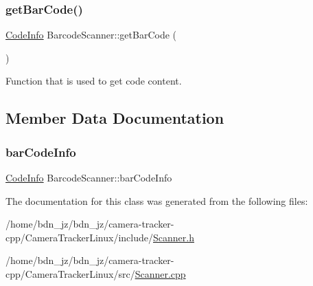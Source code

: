 \subsubsection{\texorpdfstring{get\+Bar\+Code()}{getBarCode()}}
{\footnotesize\ttfamily \hyperlink{struct_code_info}{Code\+Info} Barcode\+Scanner\+::get\+Bar\+Code (\begin{DoxyParamCaption}{ }\end{DoxyParamCaption})}



Function that is used to get code content. 



\subsection{Member Data Documentation}
\mbox{\label{class_barcode_scanner_a843ee092e719a72ed88002e89d9e9992}} 
\subsubsection{\texorpdfstring{bar\+Code\+Info}{barCodeInfo}}
{\footnotesize\ttfamily \hyperlink{struct_code_info}{Code\+Info} Barcode\+Scanner\+::bar\+Code\+Info\hspace{0.3cm}{\ttfamily [private]}}



The documentation for this class was generated from the following files\+:\begin{DoxyCompactItemize}
\item 
/home/bdn\+\_\+jz/bdn\+\_\+jz/camera-\/tracker-\/cpp/\+Camera\+Tracker\+Linux/include/\hyperlink{_scanner_8h}{Scanner.\+h}\item 
/home/bdn\+\_\+jz/bdn\+\_\+jz/camera-\/tracker-\/cpp/\+Camera\+Tracker\+Linux/src/\hyperlink{_scanner_8cpp}{Scanner.\+cpp}\end{DoxyCompactItemize}

